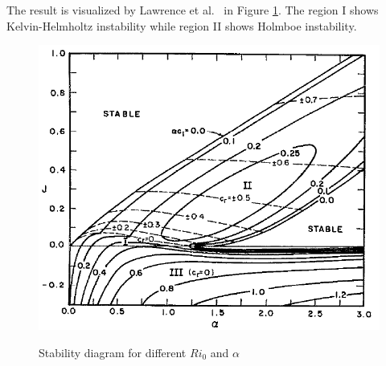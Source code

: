 The result is visualized by Lawrence et al.~\cite{Lawrence} in
Figure \ref{ho3}. The region I shows Kelvin-Helmholtz instability
while region II shows Holmboe instability.
\begin{figure}[htpb]
  \centering
  \includegraphics[width=0.9\textheight]{ho3.png}\\
  \caption{Stability diagram for different $Ri_0$ and $\alpha$}\label{ho3}
\end{figure}
